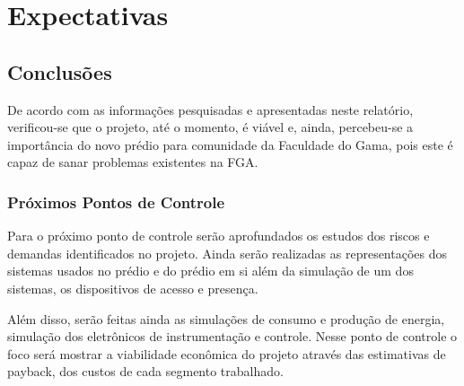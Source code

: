 \part{Expectativas}
\chapter[Conclusões]{Conclusões}
De acordo com as informações pesquisadas e apresentadas neste relatório, verificou-se que o projeto, até o momento, é viável e, ainda, percebeu-se a importância do novo prédio para comunidade da Faculdade do Gama, pois este é capaz de sanar problemas existentes na FGA.

\section{Próximos Pontos de Controle}

Para o próximo ponto de controle serão aprofundados os estudos dos riscos e demandas identificados no projeto. Ainda serão realizadas as representações dos sistemas usados no prédio e do prédio em si além da simulação de um dos sistemas, os dispositivos de acesso e presença.

Além disso, serão feitas ainda as simulações de consumo e produção de energia, simulação dos eletrônicos de instrumentação e controle. Nesse ponto de controle o foco será mostrar a viabilidade econômica do projeto através das estimativas de payback, dos custos de cada segmento trabalhado.

